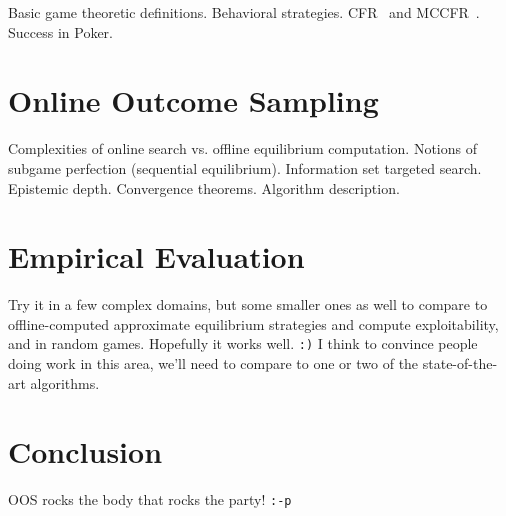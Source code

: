 \documentclass[letterpaper]{article}
\begin{document}
Basic game theoretic definitions. Behavioral strategies. 
CFR~\cite{CFR} and MCCFR~\cite{Lanctot09Sampling}. Success in Poker.

\section{Online Outcome Sampling}

Complexities of online search vs. offline equilibrium computation. Notions of subgame perfection (sequential equilibrium). Information set targeted search. Epistemic depth.
Convergence theorems. Algorithm description.

\section{Empirical Evaluation}

Try it in a few complex domains, but some smaller ones as well to compare to offline-computed approximate equilibrium strategies and compute exploitability, and in random games. 
Hopefully it works well. {\tt :)} I think to convince people doing work in this area, we'll need 
to compare to one or two of the state-of-the-art algorithms. 

\section{Conclusion}

OOS rocks the body that rocks the party! {\tt :-p}  




\end{document}
